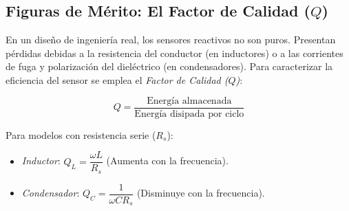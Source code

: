 
\subsection{Figuras de Mérito: El Factor de Calidad ($Q$)}
En un diseño de ingeniería real, los sensores reactivos no son puros. Presentan pérdidas debidas a la resistencia del conductor (en inductores) o a las corrientes de fuga y polarización del dieléctrico (en condensadores). Para caracterizar la eficiencia del sensor se emplea el \emph{Factor de Calidad ($Q$)}:

\begin{equation}\label{eq:factor_q}
    Q = \frac{\text{Energía almacenada}}{\text{Energía disipada por ciclo}}
\end{equation}

Para modelos con resistencia serie ($R_s$):
\begin{itemize}
    \item \emph{Inductor}: $Q_L = \dfrac{\omega L}{R_s}$ (Aumenta con la frecuencia).
    \item \emph{Condensador}: $Q_C = \dfrac{1}{\omega C R_s}$ (Disminuye con la frecuencia).
\end{itemize}


